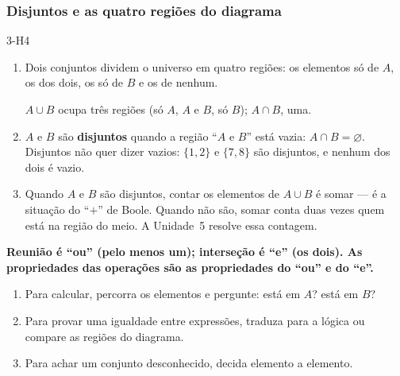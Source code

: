\subsubsection{Disjuntos e as quatro regiões do diagrama}
\begin{construcao}{3-H4}
\begin{enumerate}[label=(\arabic*)]
  \item Dois conjuntos dividem o universo em quatro regiões: os elementos só de $A$, os dos dois, os só de $B$ e os de nenhum.
\begin{center}
\end{center}
$A\cup B$ ocupa três regiões (só $A$, $A$ e $B$, só $B$); $A\cap B$, uma.
  \item $A$ e $B$ são \textbf{disjuntos} quando a região \enquote{$A$ e $B$} está vazia: $A\cap B=\varnothing$. Disjuntos não quer dizer vazios: $\{1,2\}$ e $\{7,8\}$ são disjuntos, e nenhum dos dois é vazio.
  \item Quando $A$ e $B$ são disjuntos, contar os elementos de $A\cup B$ é somar — é a situação do \enquote{$+$} de Boole. Quando não são, somar conta duas vezes quem está na região do meio. A Unidade~5 resolve essa contagem.
\end{enumerate}
\end{construcao}

\begin{paralembrar}\label{lembrar-u3}
\textbf{Reunião é \enquote{ou} (pelo menos um); interseção é \enquote{e} (os dois). As propriedades das operações são as propriedades do \enquote{ou} e do \enquote{e}.}
\begin{enumerate}[label=\arabic*.,leftmargin=1.4em,itemsep=1pt]
  \item Para calcular, percorra os elementos e pergunte: está em $A$? está em $B$?
  \item Para provar uma igualdade entre expressões, traduza para a lógica ou compare as regiões do diagrama.
  \item Para achar um conjunto desconhecido, decida elemento a elemento.
\end{enumerate}
\end{paralembrar}

